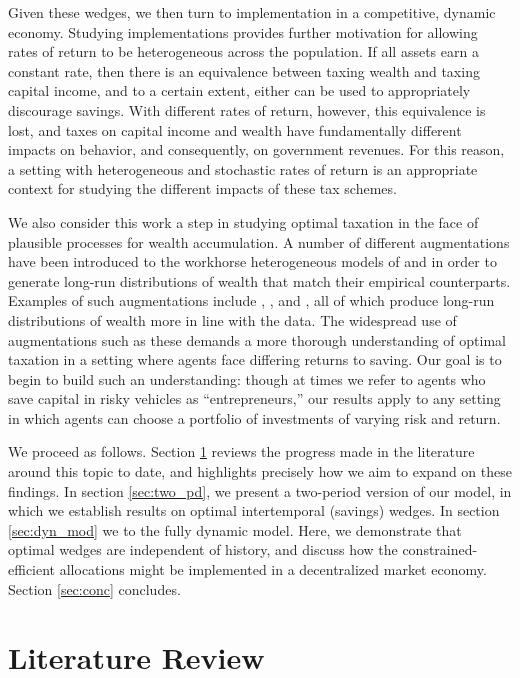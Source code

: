 \documentclass[11pt]{article}
\begin{document}
Given these wedges, we then turn to implementation in a competitive, dynamic economy. Studying implementations provides further motivation for allowing rates of return to be heterogeneous across the population. If all assets earn a constant rate, then there is an equivalence between taxing wealth and taxing capital income, and to a certain extent, either can be used to appropriately discourage savings. With different rates of return, however, this equivalence is lost, and taxes on capital income and wealth have fundamentally different impacts on behavior, and consequently, on government revenues. For this reason, a setting with heterogeneous and stochastic rates of return is an appropriate context for studying the different impacts of these tax schemes. 

We also consider this work a step in studying optimal taxation in the face of plausible processes for wealth accumulation. A number of different augmentations have been introduced to the workhorse heterogeneous models of \cite{aiyagari1994uninsured} and \cite{huggett1996wealth} in order to generate long-run distributions of wealth that match their empirical counterparts. Examples of such augmentations include \cite{quadrini2000entrepreneurship}, \cite{hubmer2016historical}, and \cite{benhabib2019wealth}, all of which produce long-run distributions of wealth more in line with the data. The widespread use of augmentations such as these demands a more thorough understanding of optimal taxation in a setting where agents face differing returns to saving. Our goal is to begin to build such an understanding: though at times we refer to agents who save capital in risky vehicles as ``entrepreneurs,'' our results apply to any setting in which agents can choose a portfolio of investments of varying risk and return. 

We proceed as follows. Section \ref{sec:lit_rev} reviews the progress made in the literature around this topic to date, and highlights precisely how we aim to expand on these findings. In section \ref{sec:two_pd}, we present a two-period version of our model, in which we establish results on optimal intertemporal (savings) wedges. In section \ref{sec:dyn_mod} we to the fully dynamic model. Here, we demonstrate that optimal wedges are independent of history, and discuss how the constrained-efficient allocations might be implemented in a decentralized market economy. Section \ref{sec:conc} concludes. 

\section{Literature Review} \label{sec:lit_rev}
\end{document}
